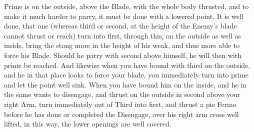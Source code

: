 \newpage


\newpage



Prime is on the outside, above the Blade, with the whole body
thrusted, and to make it much harder to parry, it must be done with a
lowered point. It is well done, that one (whereas third or second, at
the height of the Enemy's blade cannot thrust or reach) turn into
first, through this, on the outside as well as inside, bring the stong
more in the height of his weak, and thus more able to force his Blade.
Should he parry with second above himself, he will then with prime be
reached. And likewise when you have bound with third on the outside,
and he in that place looks to force your blade, you immediately turn
into prime and let the point well sink.
When you have bound him on the inside, and he in the same wants to
disengage, and thrust on the outside in second above your right Arm,
turn immediately out of Third into first, and thrust a pie Fermo
before he has done or completed the Disengage, over his right arm
cross well lifted, in this way, the lower openings are well covered.
